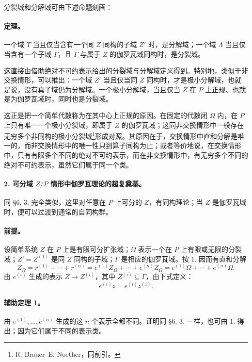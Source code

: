 分裂域和分解域可由下述命题刻画：

\paragraph{定理。}
一个域 \(T\) 当且仅当含有一个同 \(Z\) 同构的子域 \(Z'\) 时，是分解域；一个域 \(\Lambda\) 当且仅当含有一个子域 \(\Gamma\)，且 \(\Gamma\) 与属于 \(Z\) 的伽罗瓦域同构时，是分裂域。

这直接由借助绝对不可约表示给出的分裂域与分解域定义得到。特别地，类似于非交换情形，可以推出：一个域 \(Z'\) 当且仅当同 \(Z\) 同构时，才是极小分解域，也就是说，没有真子域仍为分解域。一个极小分解域，当且仅当 \(Z\) 在 \(P\) 上正规、也就是为伽罗瓦域时，同时也是分裂域。

这正是把一个简单代数称为在其中心上正规的原因。在固定的代数闭 \(\Omega\) 内，在 \(P\) 上只有唯一一个极小分裂域，即属于 \(Z\) 的伽罗瓦域；这同非交换情形中一般存在无穷多个非同构的极小分裂域\footnote{R. Brauer--E. Noether，同前引。}形成对照。其原因在于，交换情形中直和分解是唯一的，而非交换情形中的唯一性只到算子同构为止；或者等价地说，在交换情形中，只有有限多个不同的绝对不可约表示，而在非交换情形中，有无穷多个不同的绝对不可约表示，虽然它们属于同一个类。

\paragraph{2. 可分域 \(Z/P\) 情形中伽罗瓦理论的超复奠基。}
同 §6, 3. 完全类似，这里对任意在 \(P\) 上可分的 \(Z\)，有同构理论；当 \(Z\) 是伽罗瓦域时，便可以过渡到通常的自同构群。

\paragraph{前提。}
设简单系统 \(Z\) 在 \(P\) 上是有限可分扩张域；\(\Omega\) 表示一个在 \(P\) 上有限或无限的分裂域；\(Z'=Z^{(1)}\) 是同 \(Z\) 同构的子域；\(\Gamma\) 是相应的伽罗瓦域。按 1. 因而有直和分解
\[
        Z_\Omega=r^{(1)}+\cdots+r^{(n)}
        =e^{(1)}Z_\Omega+\cdots+e^{(n)}Z_\Omega
        =e^{(1)}\Omega+\cdots+e^{(n)}\Omega .
\]
由 \(e^{(i)}\) 生成的表示 \(Z\to Z^{(i)}\)，其中 \(Z^{(i)}\subseteq\Gamma\)，由下式定义：
\[
        e^{(i)}z=e^{(i)}z^{(i)}.
\]

\paragraph{辅助定理 1。}
由 \(e^{(1)},\ldots,e^{(n)}\) 生成的这 \(n\) 个表示全都不同。证明同 §6, 3. 一样，也可由 1. 得出；因为它们属于不同的表示类。

